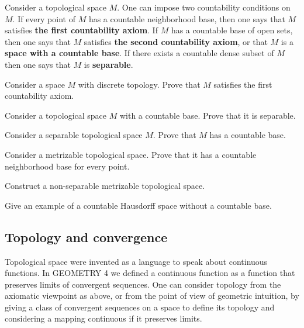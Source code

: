 \documentclass[12pt]{article}
\begin{document}
\begin{opredelenie}
  Consider a topological space $M$. One can impose two countability
  conditions on $M$. If every point of $M$ has a countable
  neighborhood base, then one says that $M$ satisfies {\bf the first
    countability axiom}. If $M$ has a countable base of open sets,
  then one says that $M$ satisfies {\bf the second countability
    axiom}, or that $M$ is a {\bf space with a countable
    base}. If there exists a countable dense subset of $M$  then one says that $M$ is {\bf separable}.
\end{opredelenie}

\begin{zadacha}
Consider a space $M$ with discrete topology. Prove that $M$ satisfies
the first countability axiom.
\end{zadacha}

\begin{zadacha} 
Consider a topological space $M$ with a countable base. Prove that it
is separable.
\end{zadacha}

\begin{zadacha}[*]
Consider a separable topological space $M$. Prove that $M$ has a
countable base. 
\end{zadacha}

\begin{zadacha}[!]
  Consider a metrizable topological space. Prove that it has a
  countable neighborhood base for every point.
\end{zadacha}

\begin{zadacha} 
Construct a non-separable metrizable topological space.
\end{zadacha}

\begin{zadacha}[**]
Give an example of a countable Hausdorff space without a countable
base.
\end{zadacha}

\subsection{Topology and convergence}

Topological space were invented as a language to speak about continuous
functions. In GEOMETRY 4 we defined a continuous function as a
function that preserves limits of convergent sequences. One can
consider topology from the axiomatic viewpoint as above, or from the
point of view of geometric intuition, by giving a class of convergent
sequences on a space to define its topology and considering a mapping
continuous if it preserves limits.
\end{document}
